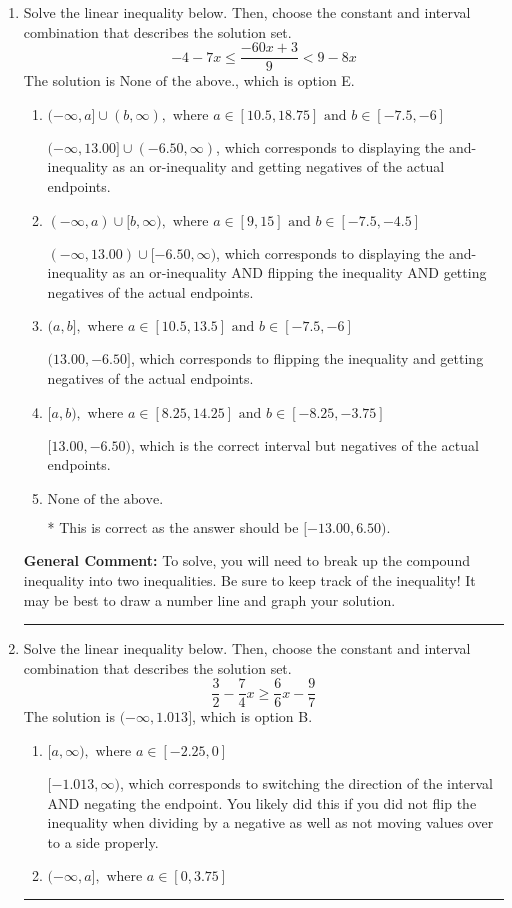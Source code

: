 \documentclass{extbook}[14pt]
\newcommand{\litem}[1]{\item #1

\rule{\textwidth}{0.4pt}}
\begin{document}
\begin{enumerate}\litem{
Solve the linear inequality below. Then, choose the constant and interval combination that describes the solution set.
\[ -4 - 7 x \leq \frac{-60 x + 3}{9} < 9 - 8 x \]The solution is \( \text{None of the above.} \), which is option E.\begin{enumerate}[label=\Alph*.]
\item \( (-\infty, a] \cup (b, \infty), \text{ where } a \in [10.5, 18.75] \text{ and } b \in [-7.5, -6] \)

$(-\infty, 13.00] \cup (-6.50, \infty)$, which corresponds to displaying the and-inequality as an or-inequality and getting negatives of the actual endpoints.
\item \( (-\infty, a) \cup [b, \infty), \text{ where } a \in [9, 15] \text{ and } b \in [-7.5, -4.5] \)

$(-\infty, 13.00) \cup [-6.50, \infty)$, which corresponds to displaying the and-inequality as an or-inequality AND flipping the inequality AND getting negatives of the actual endpoints.
\item \( (a, b], \text{ where } a \in [10.5, 13.5] \text{ and } b \in [-7.5, -6] \)

$(13.00, -6.50]$, which corresponds to flipping the inequality and getting negatives of the actual endpoints.
\item \( [a, b), \text{ where } a \in [8.25, 14.25] \text{ and } b \in [-8.25, -3.75] \)

$[13.00, -6.50)$, which is the correct interval but negatives of the actual endpoints.
\item \( \text{None of the above.} \)

* This is correct as the answer should be $[-13.00, 6.50)$.
\end{enumerate}

\textbf{General Comment:} To solve, you will need to break up the compound inequality into two inequalities. Be sure to keep track of the inequality! It may be best to draw a number line and graph your solution.
}
\litem{
Solve the linear inequality below. Then, choose the constant and interval combination that describes the solution set.
\[ \frac{3}{2} - \frac{7}{4} x \geq \frac{6}{6} x - \frac{9}{7} \]The solution is \( (-\infty, 1.013] \), which is option B.\begin{enumerate}[label=\Alph*.]
\item \( [a, \infty), \text{ where } a \in [-2.25, 0] \)

 $[-1.013, \infty)$, which corresponds to switching the direction of the interval AND negating the endpoint. You likely did this if you did not flip the inequality when dividing by a negative as well as not moving values over to a side properly.
\item \( (-\infty, a], \text{ where } a \in [0, 3.75] \)


\end{enumerate}}
\end{enumerate}
\end{document}
